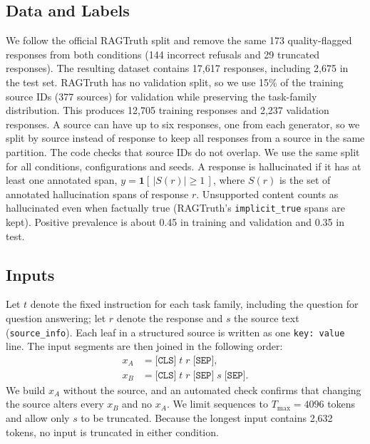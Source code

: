 \documentclass[conference]{IEEEtran}
\newcommand{\NTrain}{12{,}705}      %
\newcommand{\NVal}{2{,}237}        %
\newcommand{\NValSrc}{377}     %
\begin{document}
\subsection{Data and Labels}
We follow the official RAGTruth split and remove the same 173 quality-flagged
responses from both conditions (144 incorrect refusals and 29 truncated
responses). The resulting dataset contains 17{,}617 responses, including
2{,}675 in the test set. RAGTruth has no validation split, so we use 15\% of the training source IDs
(\NValSrc{} sources) for validation while preserving the task-family
distribution. This produces \NTrain{} training responses and \NVal{} validation
responses. A source can have up to six responses, one from each generator, so
we split by source instead of response to keep all responses from a source in
the same partition. The code checks that source IDs do not overlap. We use the same split for all
conditions, configurations and seeds. A response is hallucinated if it has at
least one annotated span, $y=\mathbf{1}[\,|S(r)|\ge 1\,]$, where $S(r)$ is the
set of annotated hallucination spans of response $r$.
Unsupported content counts as hallucinated even when factually true (RAGTruth's
\texttt{implicit\_true} spans are kept). Positive prevalence is about 0.45 in
training and validation and 0.35 in test.

\subsection{Inputs}
Let $t$ denote the fixed instruction for each task family, including the
question for question answering; let $r$ denote the response and $s$ the source
text (\texttt{source\_info}). Each leaf in a structured source is 
written as one \texttt{key: value} line.
The input segments are then joined in the following order:
\begin{align}
x_A &= \texttt{[CLS]}\; t\; r\; \texttt{[SEP]}, \label{eq:xa}\\
x_B &= \texttt{[CLS]}\; t\; r\; \texttt{[SEP]}\; s\; \texttt{[SEP]}. \label{eq:xb}
\end{align}
We build $x_A$ without the source, and an automated check confirms that changing
the source alters every $x_B$ and no $x_A$. We limit sequences to
$T_{\max}=4096$ tokens and allow only $s$ to be truncated. Because the longest
input contains 2{,}632 tokens, no input is truncated in either condition.
\end{document}
